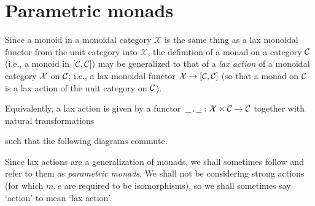 \chapter{Parametric monads}
\label{ChapParametricMonads}

Since a monoid in a monoidal category $\mathcal X$ is the same thing as a lax monoidal functor from the unit category into $\mathcal X$, the definition of a monad on a category ${\mathcal{C}}$ (i.e., a monoid in $[{\mathcal{C}},{\mathcal{C}}]$) may be generalized to that of a \emph{lax action} \cite{LaxActions} of a monoidal category $\mathcal X$ on ${\mathcal{C}}$; i.e., a lax monoidal functor $\mathcal X \to [{\mathcal{C}},{\mathcal{C}}]$ (so that a monad on ${\mathcal{C}}$ is a lax action of the unit category on ${\mathcal{C}}$).

Equivalently, a lax action is given by a functor $\,\underline{\hspace{1.5ex}}\,.\,\underline{\hspace{1.5ex}}\, \colon \mathcal X \times {\mathcal{C}} \to {\mathcal{C}}$ together with natural transformations
such that the following diagrams commute.
Since lax actions are a generalization of monads, we shall sometimes follow \Mellies \cite{ParametricMonads} and refer to them as \emph{parametric monads}.
We shall not be considering strong actions (for which $m,e$ are required to be isomorphisms), so we shall sometimes say `action' to mean `lax action'.

